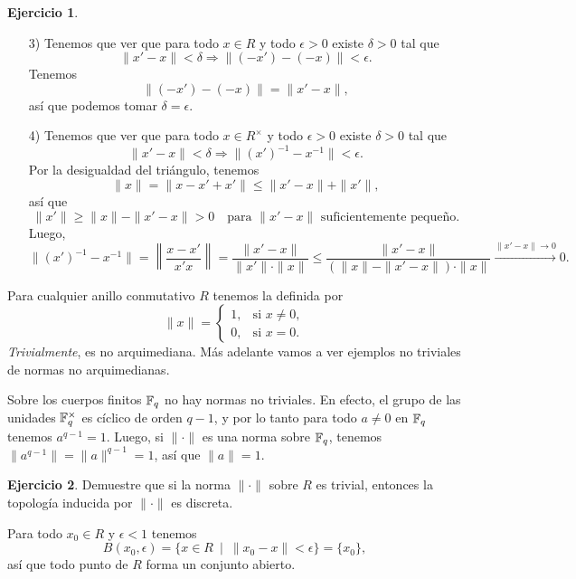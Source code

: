 \documentclass{article}
\numberwithin{equation}{section}
\theoremstyle{definition}
\newtheorem{ejerc}{Ejercicio}
\begin{document}
\begin{ejerc}
\begin{solucion}
\begin{enumerate}
    \item[3)] Tenemos que ver que para todo $x\in R$ y todo $\epsilon > 0$
      existe $\delta > 0$ tal que
      $$\|x'-x\| < \delta \Longrightarrow \|(-x') - (-x)\| < \epsilon.$$
      Tenemos
      $$\|(-x') - (-x)\| = \|x' - x\|,$$
      así que podemos tomar $\delta = \epsilon$.

    \item[4)] Tenemos que ver que para todo $x\in R^\times$ y todo
      $\epsilon > 0$ existe $\delta > 0$ tal que
      $$\|x'-x\| < \delta \Longrightarrow \|(x')^{-1} - x^{-1}\| < \epsilon.$$
      Por la desigualdad del triángulo, tenemos
      $$\|x\| = \|x - x' + x'\| \le \|x'-x\| + \|x'\|,$$
      así que
      \[ \|x'\| \ge \|x\| - \|x'-x\| > 0 \quad
         \text{para }\|x' - x\|\text{ suficientemente pequeño}. \]
      Luego,
      \[ \|(x')^{-1} - x^{-1}\| =
         \left\|\frac{x-x'}{x'x}\right\| =
         \frac{\|x'-x\|}{\|x'\| \cdot \|x\|} \le
         \frac{\|x'-x\|}{(\|x\| - \|x'-x\|) \cdot \|x\|}
         \xrightarrow{\|x'-x\| \to 0} 0.  \]
    \end{enumerate}
  \end{solucion}\fi
\end{ejerc}

\begin{ejemplo}
  \label{ejemplo:norma-trivial}
  Para cualquier anillo conmutativo $R$ tenemos la  definida
  por
  $$\|x\| = \begin{cases}
    1, & \text{si }x \ne 0,\\
    0, & \text{si }x = 0.
  \end{cases}$$
  \emph{Trivialmente}, es no arquimediana. Más adelante vamos a ver ejemplos no
  triviales de normas no arquimedianas.
\end{ejemplo}

\begin{ejemplo}
  \label{ejemplo:normas-sobre-cuerpos-finitos}
  Sobre los cuerpos finitos $\mathbb{F}_q$ no hay normas no triviales. En efecto,
  el grupo de las unidades $\mathbb{F}_q^\times$ es cíclico de orden $q-1$,
  y por lo tanto para todo $a \ne 0$ en $\mathbb{F}_q$ tenemos $a^{q-1} = 1$.
  Luego, si $\|\cdot\|$ es una norma sobre $\mathbb{F}_q$, tenemos
  $\|a^{q-1}\| = \|a\|^{q-1} = 1$, así que $\|a\| = 1$.
\end{ejemplo}

\begin{ejerc}
  Demuestre que si la norma $\|\cdot\|$ sobre $R$ es trivial, entonces
  la topología inducida por $\|\cdot\|$ es discreta.

  \ifdefined\solutions\begin{solucion}
    Para todo $x_0\in R$ y $\epsilon < 1$ tenemos
    $$B (x_0,\epsilon) = \{ x\in R ~\mid~ \|x_0-x\| < \epsilon \} = \{ x_0 \},$$
    así que todo punto de $R$ forma un conjunto abierto.
  \end{solucion}\fi
\end{ejerc}
\end{document}
